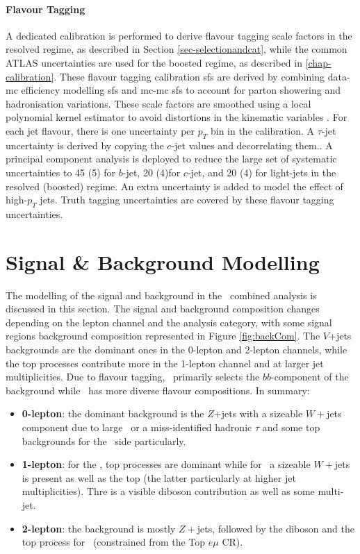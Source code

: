 \paragraph{Flavour Tagging} A dedicated calibration is performed to derive flavour tagging scale factors in the resolved regime, as described in Section \ref{sec-selectionandcat}, while the common ATLAS uncertainties are used for the boosted regime, as described in \ref{chap-calibration}. These flavour tagging calibration \gls{sf}s are derived by combining data-\gls{mc} efficiency modelling \gls{sf}s and \gls{mc}-\gls{mc} \gls{sf}s to account for parton showering and hadronisation variations. These scale factors are smoothed using a local polynomial kernel estimator to avoid distortions in the kinematic variables \cite{ATL-PHYS-PUB-2020-004}. For each jet flavour, there is one uncertainty per $p_T$ bin in the calibration. A $\tau$-jet uncertainty is derived by copying the $c$-jet values and decorrelating them.. A principal component analysis is deployed to reduce the large set of systematic uncertainties to 45 (5) for $b$-jet, 20 (4)for $c$-jet, and 20 (4) for light-jets in the resolved (boosted) regime. An extra uncertainty is added to model the effect of high-$p_T$ jets. Truth tagging uncertainties are covered by these flavour tagging uncertainties.

%
\section{Signal \& Background Modelling}\label{sec-mod}
The modelling of the signal and background in the \vhbc\ combined analysis is discussed in this section. The signal and background composition changes depending on the lepton channel and the analysis category, with some signal regions background composition represented in Figure \ref{fig:backCom}. The $V$+jets backgrounds are the dominant ones in the 0-lepton and 2-lepton channels, while the top processes contribute more in the 1-lepton channel and at larger jet multiplicities. Due to flavour tagging, \vhb\ primarily selects the $bb$-component of the background while \vhc\ has more diverse flavour compositions. In summary:
\begin{itemize}
    \item \textbf{0-lepton}: the dominant background is the $Z$+jets with a sizeable $W+$jets component due to large \etm\ or a miss-identified hadronic $\tau$ and some top backgrounds for the \vhb\ side particularly.
    \item \textbf{1-lepton}: for the \vhb, top processes are dominant while for \vhc\ a sizeable $W+$jets is present as well as the top (the latter particularly at higher jet multiplicities). Thre is a visible diboson contribution as well as some multi-jet.  
    \item \textbf{2-lepton}: the background is mostly $Z+$jets, followed by the diboson and the top process for \vhb\ (constrained from the Top $e\mu$ CR). 
\end{itemize}

